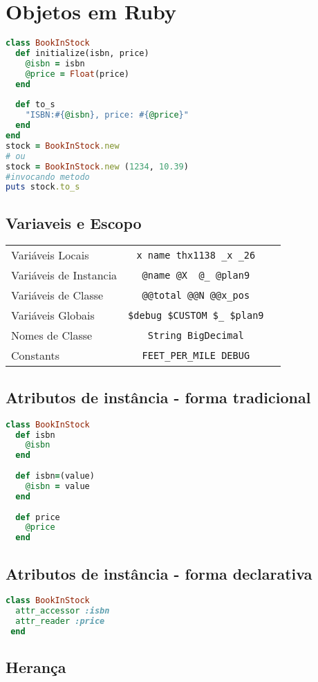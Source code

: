 \documentclass[serif,mathserif]{book}
\begin{document}
\chapter{Objetos em Ruby}
\begin{lstlisting}[language=ruby]
class BookInStock
  def initialize(isbn, price)
    @isbn = isbn
    @price = Float(price)
  end
 
  def to_s
    "ISBN:#{@isbn}, price: #{@price}"
  end
end
stock = BookInStock.new
# ou
stock = BookInStock.new (1234, 10.39)
#invocando metodo
puts stock.to_s
\end{lstlisting}


\section{Variaveis e Escopo}

\begin{tabular}{ l | c | r }
Variáveis Locais & \verb|x name thx1138 _x _26| \\
Variáveis de Instancia & \verb|@name @X  @_ @plan9| \\
Variáveis de Classe & \verb|@@total @@N @@x_pos| \\
Variáveis Globais & \verb|$debug $CUSTOM $_ $plan9| \\
Nomes de Classe & \verb|String BigDecimal| \\
Constants & \verb|FEET_PER_MILE DEBUG|
\end{tabular}

\section{Atributos de instância - forma tradicional}
\begin{lstlisting}[language=ruby]
class BookInStock  
  def isbn
    @isbn
  end
 
  def isbn=(value)
    @isbn = value
  end
 
  def price
    @price
  end
\end{lstlisting}

\section{Atributos de instância - forma declarativa}
\begin{lstlisting}[language=ruby]
class BookInStock  
  attr_accessor :isbn
  attr_reader :price
 end
\end{lstlisting}

\section{Herança}
\end{document}
